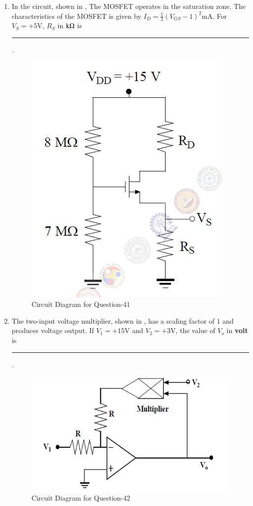 \documentclass[journal,12pt,onecolumn]{IEEEtran}
\theoremstyle{remark}
\begin{document}
\begin{enumerate}
\item In the circuit, shown in , The MOSFET operates in the saturation zone. The characteristics of the MOSFET is given by $I_D = \frac{1}{2}(V_{GS} - 1)^2\text{mA}$. For $V_S = +5\text{V}$, $R_S$ in $\text{k}\ohm$ is \rule{1.5cm}{0.4pt}. \par \hfill{}
\begin{figure}[H]
    \centering
    \includegraphics[width=0.4\columnwidth]{Figs/Q-41.png}
    \caption{Circuit Diagram for Question-41}
    \label{fig:placeholder_19}
\end{figure}

\item The two-input voltage multiplier, shown in , has a scaling factor of $1$ and produces voltage output. If $V_1 = +15\text{V}$ and $V_2 = +3\text{V}$, the value of $V_o$ in \textbf{volt} is \rule{1.5cm}{0.4pt}. \par \hfill{}
\begin{figure}[H]
    \centering
    \includegraphics[width=0.5\columnwidth]{Figs/Q-42.png}
    \caption{Circuit Diagram for Question-42}
    \label{fig:placeholder_20}
\end{figure}



\end{enumerate}
\end{document}
